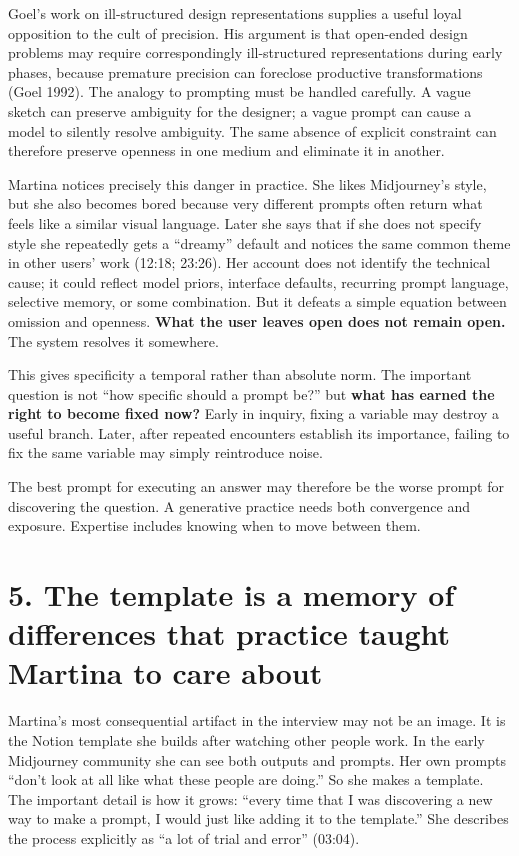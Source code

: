 \documentclass[
  11pt,
  letterpaper,
]{article}
\begin{document}
Goel's work on ill-structured design representations supplies a useful
loyal opposition to the cult of precision. His argument is that
open-ended design problems may require correspondingly ill-structured
representations during early phases, because premature precision can
foreclose productive transformations (Goel 1992). The analogy to
prompting must be handled carefully. A vague sketch can preserve
ambiguity for the designer; a vague prompt can cause a model to silently
resolve ambiguity. The same absence of explicit constraint can therefore
preserve openness in one medium and eliminate it in another.

Martina notices precisely this danger in practice. She likes
Midjourney's style, but she also becomes bored because very different
prompts often return what feels like a similar visual language. Later
she says that if she does not specify style she repeatedly gets a
``dreamy'' default and notices the same common theme in other users'
work (12:18; 23:26). Her account does not identify the technical cause;
it could reflect model priors, interface defaults, recurring prompt
language, selective memory, or some combination. But it defeats a simple
equation between omission and openness. \textbf{What the user leaves
open does not remain open.} The system resolves it somewhere.

This gives specificity a temporal rather than absolute norm. The
important question is not ``how specific should a prompt be?'' but
\textbf{what has earned the right to become fixed now?} Early in
inquiry, fixing a variable may destroy a useful branch. Later, after
repeated encounters establish its importance, failing to fix the same
variable may simply reintroduce noise.

The best prompt for executing an answer may therefore be the worse
prompt for discovering the question. A generative practice needs both
convergence and exposure. Expertise includes knowing when to move
between them.

\section{5. The template is a memory of differences that practice taught
Martina to care
about}\label{the-template-is-a-memory-of-differences-that-practice-taught-martina-to-care-about}

Martina's most consequential artifact in the interview may not be an
image. It is the Notion template she builds after watching other people
work. In the early Midjourney community she can see both outputs and
prompts. Her own prompts ``don't look at all like what these people are
doing.'' So she makes a template. The important detail is how it grows:
``every time that I was discovering a new way to make a prompt, I would
just like adding it to the template.'' She describes the process
explicitly as ``a lot of trial and error'' (03:04).
\end{document}
